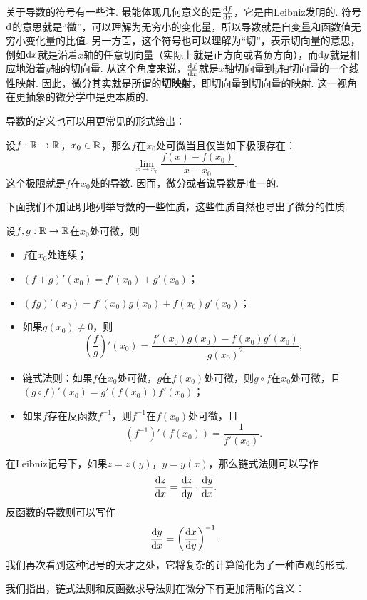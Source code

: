 关于导数的符号有一些注. 最能体现几何意义的是$\frac{\mathrm{d} f}{\mathrm{d} x}$，它是由Leibniz发明的. 符号$\mathrm{d}$的意思就是“微”，可以理解为无穷小的变化量，所以导数就是自变量和函数值无穷小变化量的比值. 另一方面，这个符号也可以理解为“切”，表示切向量的意思，例如$\mathrm{d} x$就是沿着$x$轴的任意切向量（实际上就是正方向或者负方向），而$\mathrm{d} y$就是相应地沿着$y$轴的切向量. 从这个角度来说，$\frac{\mathrm{d} f}{\mathrm{d} x}$就是$x$轴切向量到$y$轴切向量的一个线性映射. 因此，微分其实就是所谓的\textbf{切映射}，即切向量到切向量的映射. 这一视角在更抽象的微分学中是更本质的. 

导数的定义也可以用更常见的形式给出：

\begin{proposition}\label{proposition:derivative}
    设$f:\mathbb{R}\to\mathbb{R}$，$x_0\in\mathbb{R}$，那么$f$在$x_0$处可微当且仅当如下极限存在：
    \[
        \lim_{x\to x_0}\frac{f(x)-f(x_0)}{x-x_0}.
    \]
    这个极限就是$f$在$x_0$处的导数. 因而，微分或者说导数是唯一的. 
\end{proposition}

下面我们不加证明地列举导数的一些性质，这些性质自然也导出了微分的性质. 

\begin{proposition}\label{proposition:uni-derivative-property}
    设$f,g:\mathbb{R}\to\mathbb{R}$在$x_0$处可微，则
    \begin{itemize}
        \item $f$在$x_0$处连续；
        \item $(f+g)'(x_0)=f'(x_0)+g'(x_0)$；
        \item $(fg)'(x_0)=f'(x_0)g(x_0)+f(x_0)g'(x_0)$；
        \item 如果$g(x_0)\neq 0$，则
        \[\left(\frac{f}{g}\right)'(x_0)=\frac{f'(x_0)g(x_0)-f(x_0)g'(x_0)}{g(x_0)^2};\]
        \item 链式法则：如果$f$在$x_0$处可微，$g$在$f(x_0)$处可微，则$g\circ f$在$x_0$处可微，且$(g\circ f)'(x_0)=g'(f(x_0))f'(x_0)$；
        \item 如果$f$存在反函数$f^{-1}$，则$f^{-1}$在$f(x_0)$处可微，且
        \[(f^{-1})'(f(x_0))=\frac{1}{f'(x_0)}.\]
    \end{itemize}
\end{proposition}

在Leibniz记号下，如果$z=z(y)$，$y=y(x)$，那么链式法则可以写作
\[
    \frac{\mathrm{d} z}{\mathrm{d} x}=\frac{\mathrm{d} z}{\mathrm{d} y}\cdot\frac{\mathrm{d} y}{\mathrm{d} x}.
\]
反函数的导数则可以写作
\[
    \frac{\mathrm{d} y}{\mathrm{d} x}=\left(\frac{\mathrm{d} x}{\mathrm{d} y}\right)^{-1}.
\]
我们再次看到这种记号的天才之处，它将复杂的计算简化为了一种直观的形式.

我们指出，链式法则和反函数求导法则在微分下有更加清晰的含义：

